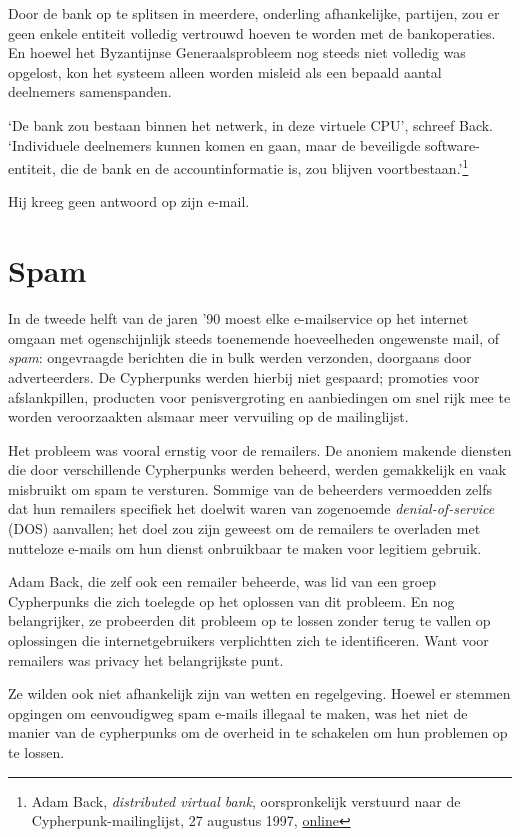 \documentclass[
  a5paper,
  smalldemyvopaper,11pt,twoside,onecolumn,openright,extrafontsizes,
hidelinks]{memoir}
\begin{document}
Door de bank op te splitsen in meerdere, onderling afhankelijke,
partijen, zou er geen enkele entiteit volledig vertrouwd hoeven te
worden met de bankoperaties. En hoewel het Byzantijnse Generaalsprobleem
nog steeds niet volledig was opgelost, kon het systeem alleen worden
misleid als een bepaald aantal deelnemers samenspanden.

`De bank zou bestaan binnen het netwerk, in deze virtuele CPU', schreef
Back. `Individuele deelnemers kunnen komen en gaan, maar de beveiligde
software-entiteit, die de bank en de accountinformatie is, zou blijven
voortbestaan.'\footnote{Adam Back, \emph{distributed virtual bank},
  oorspronkelijk verstuurd naar de Cypherpunk-mailinglijst, 27 augustus
  1997,
  \href{https://cypherpunks.venona.com/date/1997/08/msg01289.html}{online}}

Hij kreeg geen antwoord op zijn e-mail.

\section{Spam}\label{spam}

In de tweede helft van de jaren '90 moest elke e-mailservice op het
internet omgaan met ogenschijnlijk steeds toenemende hoeveelheden
ongewenste mail, of \emph{spam}: ongevraagde berichten die in bulk
werden verzonden, doorgaans door adverteerders. De Cypherpunks werden
hierbij niet gespaard; promoties voor afslankpillen, producten voor
penisvergroting en aanbiedingen om snel rijk mee te worden veroorzaakten
alsmaar meer vervuiling op de mailinglijst.

Het probleem was vooral ernstig voor de remailers. De anoniem makende
diensten die door verschillende Cypherpunks werden beheerd, werden
gemakkelijk en vaak misbruikt om spam te versturen. Sommige van de
beheerders vermoedden zelfs dat hun remailers specifiek het doelwit
waren van zogenoemde \emph{denial-of-service} (DOS) aanvallen; het doel
zou zijn geweest om de remailers te overladen met nutteloze e-mails om
hun dienst onbruikbaar te maken voor legitiem gebruik.

Adam Back, die zelf ook een remailer beheerde, was lid van een groep
Cypherpunks die zich toelegde op het oplossen van dit probleem. En nog
belangrijker, ze probeerden dit probleem op te lossen zonder terug te
vallen op oplossingen die internetgebruikers verplichtten zich te
identificeren. Want voor remailers was privacy het belangrijkste punt.

Ze wilden ook niet afhankelijk zijn van wetten en regelgeving. Hoewel er
stemmen opgingen om eenvoudigweg spam e-mails illegaal te maken, was het
niet de manier van de cypherpunks om de overheid in te schakelen om hun
problemen op te lossen.
\end{document}
